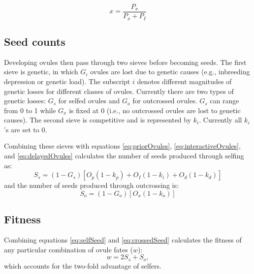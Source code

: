 \documentclass[12pt]{amsart}
\begin{document}
\begin{equation} \label{eq:outcross}
x =\frac{P_{x}}{P_{x}+P_{I}}
\end{equation}

\subsection{Seed counts}
Developing ovules then pass through two sieves before becoming seeds. The first sieve is genetic, in which $G_{i}$ ovules are lost due to genetic causes (e.g., inbreeding depression or genetic load). The subscript $i$ denotes different magnitudes of genetic losses for different classes of ovules. Currently there are two types of genetic losses: $G_{s}$ for selfed ovules and $G_{o}$ for outcrossed ovules. $G_{s}$ can range from 0 to 1 while $G_{x}$ is fixed at 0 (i.e., no outcrossed ovules are lost to genetic causes). The second sieve is competitive and is represented by $k_{i}$. Currently all $k_{i}$'s are set to 0.

Combining these sieves with equations \ref{eq:priorOvules}, \ref{eq:interactiveOvules}, and \ref{eq:delayedOvules} calculates the number of seeds produced through selfing as:
\begin{equation} \label{eq:selfSeed}
S_{s}=(1-G_{s})[O_{p}(1-k_{p})+O_{I}(1-k_{i})+O_{d}(1-k_{d})]
\end{equation}
and the number of seeds produced through outcrossing is:
\begin{equation} \label{eq:crossedSeed}
S_{o}=(1-G_{o})[O_{x}(1-k_{o})]
\end{equation}

\subsection{Fitness}

Combining equations \ref{eq:selfSeed} and \ref{eq:crossedSeed} calculates the fitness of any particular combination of ovule fates ($w$):
\begin{equation} \label{eq:fitness}
w=2 S_{s}+ S_{o} ,
\end{equation}
which accounts for the two-fold advantage of selfers.

\end{document}
